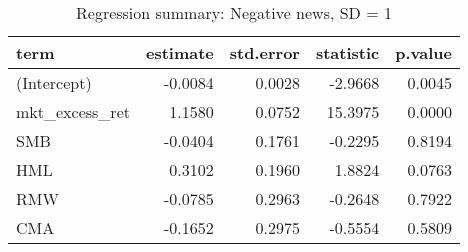 \begin{table}[H]
\centering
\caption{Regression summary: Negative news, SD = 1} 
\begin{tabular}{lrrrr}
  \hline
term & estimate & std.error & statistic & p.value \\ 
  \hline
(Intercept) & -0.0084 & 0.0028 & -2.9668 & 0.0045 \\ 
  mkt\_excess\_ret & 1.1580 & 0.0752 & 15.3975 & 0.0000 \\ 
  SMB & -0.0404 & 0.1761 & -0.2295 & 0.8194 \\ 
  HML & 0.3102 & 0.1960 & 1.8824 & 0.0763 \\ 
  RMW & -0.0785 & 0.2963 & -0.2648 & 0.7922 \\ 
  CMA & -0.1652 & 0.2975 & -0.5554 & 0.5809 \\ 
   \hline
\end{tabular}
\label{tab: summary_neg_1}
\end{table}

